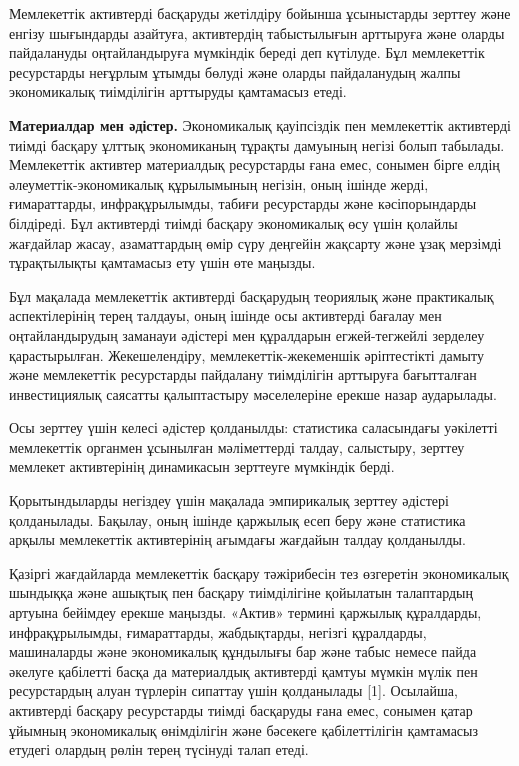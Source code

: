 \begin{multicols}{2}
Мемлекеттік активтерді басқаруды жетілдіру бойынша ұсыныстарды зерттеу
және енгізу шығындарды азайтуға, активтердің табыстылығын арттыруға және
оларды пайдалануды оңтайландыруға мүмкіндік береді деп күтілуде. Бұл
мемлекеттік ресурстарды неғұрлым ұтымды бөлуді және оларды пайдаланудың
жалпы экономикалық тиімділігін арттыруды қамтамасыз етеді.

{\bfseries Материалдар мен әдістер.} Экономикалық қауіпсіздік пен
мемлекеттік активтерді тиімді басқару ұлттық экономиканың тұрақты
дамуының негізі болып табылады. Мемлекеттік активтер материалдық
ресурстарды ғана емес, сонымен бірге елдің әлеуметтік-экономикалық
құрылымының негізін, оның ішінде жерді, ғимараттарды, инфрақұрылымды,
табиғи ресурстарды және кәсіпорындарды білдіреді. Бұл активтерді тиімді
басқару экономикалық өсу үшін қолайлы жағдайлар жасау, азаматтардың өмір
сүру деңгейін жақсарту және ұзақ мерзімді тұрақтылықты қамтамасыз ету
үшін өте маңызды.

Бұл мақалада мемлекеттік активтерді басқарудың теориялық және
практикалық аспектілерінің терең талдауы, оның ішінде осы активтерді
бағалау мен оңтайландырудың заманауи әдістері мен құралдарын
егжей-тегжейлі зерделеу қарастырылған. Жекешелендіру,
мемлекеттік-жекеменшік әріптестікті дамыту және мемлекеттік ресурстарды
пайдалану тиімділігін арттыруға бағытталған инвестициялық саясатты
қалыптастыру мәселелеріне ерекше назар аударылады.

Осы зерттеу үшін келесі әдістер қолданылды: статистика саласындағы
уәкілетті мемлекеттік органмен ұсынылған мәліметтерді талдау, салыстыру,
зерттеу мемлекет активтерінің динамикасын зерттеуге мүмкіндік берді.

Қорытындыларды негіздеу үшін мақалада эмпирикалық зерттеу әдістері
қолданылады. Бақылау, оның ішінде қаржылық есеп беру және статистика
арқылы мемлекеттік активтерінің ағымдағы жағдайын талдау қолданылды.

Қазіргі жағдайларда мемлекеттік басқару тәжірибесін тез өзгеретін
экономикалық шындыққа және ашықтық пен басқару тиімділігіне қойылатын
талаптардың артуына бейімдеу ерекше маңызды. «Актив» термині қаржылық
құралдарды, инфрақұрылымды, ғимараттарды, жабдықтарды, негізгі
құралдарды, машиналарды және экономикалық құндылығы бар және табыс
немесе пайда әкелуге қабілетті басқа да материалдық активтерді қамтуы
мүмкін мүлік пен ресурстардың алуан түрлерін сипаттау үшін қолданылады
{[}1{]}. Осылайша, активтерді басқару ресурстарды тиімді басқаруды ғана
емес, сонымен қатар ұйымның экономикалық өнімділігін және бәсекеге
қабілеттілігін қамтамасыз етудегі олардың рөлін терең түсінуді талап
етеді.


\end{multicols}
